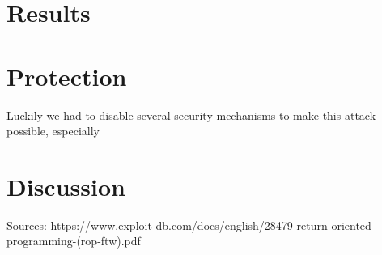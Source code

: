 \documentclass[journal=tosc,submission]{iacrtrans}
\begin{document}
\section{Results}

\section{Protection}
Luckily we had to disable several security mechanisms to make this attack possible, especially 

\section{Discussion}
Sources:
https://www.exploit-db.com/docs/english/28479-return-oriented-programming-(rop-ftw).pdf


\end{document}
